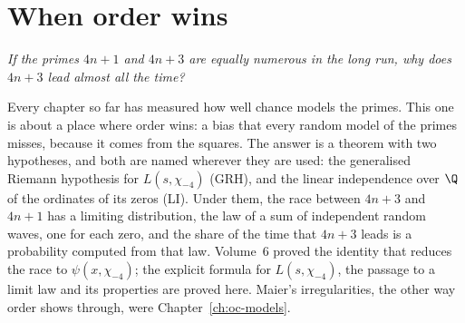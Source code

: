 \chapter{When order wins}\label{ch:oc-bias}\label{ch:bias}

\begin{center}\itshape
If the primes $4n+1$ and $4n+3$ are equally numerous in the long run, why does $4n+3$ lead almost all the time?
\end{center}

Every chapter so far has measured how well chance models the primes. This one is about a place where order wins: a bias that every random model of the primes misses, because it comes from the squares. The answer is a theorem with two hypotheses, and both are named wherever they are used: the generalised Riemann hypothesis for $L(s,\chi_{-4})$ (GRH), and the linear independence over $\Q$ of the ordinates of its zeros (LI). Under them, the race between $4n+3$ and $4n+1$ has a limiting distribution, the law of a sum of independent random waves, one for each zero, and the share of the time that $4n+3$ leads is a probability computed from that law. Volume~6 proved the identity that reduces the race to $\psi(x,\chi_{-4})$; the explicit formula for $L(s,\chi_{-4})$, the passage to a limit law and its properties are proved here. Maier's irregularities, the other way order shows through, were Chapter~\ref{ch:oc-models}.


